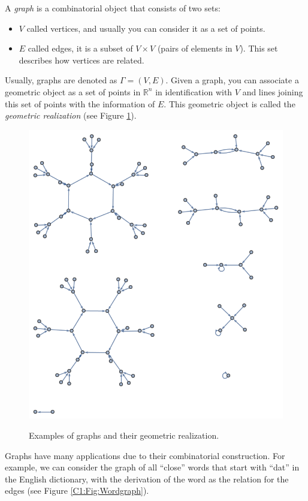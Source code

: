 \documentclass[
	fontsize=10pt, %
	twoside=false, %
	secnumdepth=1, %
]{kaobook}
\begin{document}
\begin{example}
A \emph{graph} is a combinatorial object that consists of two sets:
\begin{itemize}
\item $V$ called vertices, and usually you can consider it as a set of points.
\item $E$ called edges, it is a subset of $V\times V$ (pairs of elements in $V$). This set describes how vertices are related.
\end{itemize}
Usually, graphs are denoted as $\Gamma=(V, E).$ Given a graph, you can associate a geometric object as a set of points in $\mathbb{R}^n$ in identification with $V$ and lines joining this set of points with the information of $E.$ This geometric object is called the \emph{geometric realization} (see Figure \ref{C1:Fig:Graphs}).

 \begin{figure}[h]
\includegraphics[scale=0.5]{DirectedGraphs.png}
\label{C1:Fig:Graphs}
\caption{Examples of graphs and their geometric realization.}
\end{figure}

Graphs have many applications due to their combinatorial construction. For example, we can consider the graph of all ``close'' words that start with ``dat'' in the English dictionary, with the derivation of the word as the relation for the edges (see Figure \ref{C1:Fig:Wordgraph}).


\end{example}
\end{document}

